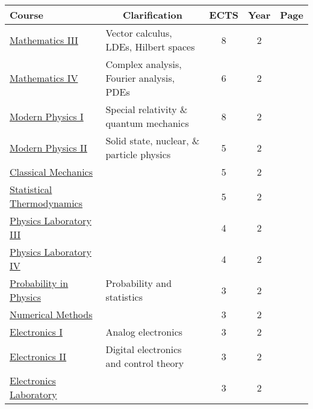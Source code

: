 \documentclass[11pt, a4paper]{article}
\begin{document}
\begin{adjustbox}{center}
\begin{tabular}{|l|l|c|c|c|}
    \textbf{Course} & \multicolumn{1}{c}{\textbf{Clarification}} & \textbf{ECTS} & \textbf{Year} & \textbf{Page}\\
    \hline
    \hline {\rule{0pt}{2.5ex}} \hspace{-7pt}
    \hyperref[mathematics_3]{Mathematics III} & Vector calculus, LDEs, Hilbert spaces & 8 & 2 & \pageref{mathematics_3} \\
    \hyperref[mathematics_4]{Mathematics IV} & Complex analysis, Fourier analysis, PDEs & 6 & 2 & \pageref{mathematics_4} \\
    \hyperref[modern_physics_1]{Modern Physics I} & Special relativity \& quantum mechanics & 8 & 2 & \pageref{modern_physics_1} \\
    \hyperref[modern_physics_2]{Modern Physics II} & Solid state, nuclear, \& particle physics & 5 & 2 & \pageref{modern_physics_2} \\
    \hyperref[classical_mechanics]{Classical Mechanics} & & 5 & 2 & \pageref{classical_mechanics} \\
    \hyperref[statistical_thermodynamics]{Statistical Thermodynamics} & & 5 & 2 & \pageref{statistical_thermodynamics} \\
    \hyperref[physics_laboratory_3]{Physics Laboratory III} & & 4 & 2 & \pageref{physics_laboratory_3} \\
    \hyperref[physics_laboratory_4]{Physics Laboratory IV} & & 4 & 2 & \pageref{physics_laboratory_4} \\
    \hyperref[probability_in_physics]{Probability in Physics} & Probability and statistics & 3 & 2 & \pageref{probability_in_physics} \\
    \hyperref[numerical_methods]{Numerical Methods} & & 3 & 2 & \pageref{numerical_methods} \\
    \hyperref[electronics_1]{Electronics I} & Analog electronics & 3 & 2 & \pageref{electronics_1} \\
    \hyperref[electronics_2]{Electronics II} & Digital electronics and control theory & 3 & 2 & \pageref{electronics_2} \\
    \hyperref[electronics_laboratory]{Electronics Laboratory} & & 3 & 2 & \pageref{electronics_laboratory} \\
    \hline
    \hline


\end{tabular}
\end{adjustbox}
\end{document}
